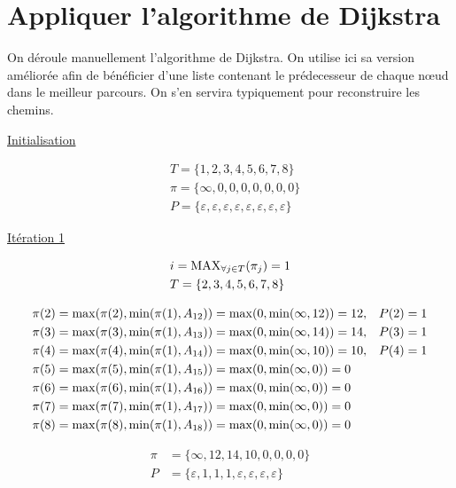 \documentclass{article}
\begin{document}
\section{Appliquer l'algorithme de Dijkstra }

On déroule manuellement l'algorithme de Dijkstra. On utilise ici sa
version améliorée afin de bénéficier d'une liste contenant le
prédecesseur de chaque n\oe ud dans le meilleur parcours. On s'en
servira typiquement pour reconstruire les chemins.

\newpage

\underline{Initialisation}

\begin{align*}
  &T = \{1,2,3,4,5,6,7,8\} \\
  &\pi = \{\infty, 0,0,0,0,0,0,0\} \\
  &P = \{\varepsilon,\varepsilon,\varepsilon,\varepsilon,\varepsilon,\varepsilon,\varepsilon,\varepsilon\}
\end{align*}

\underline{Itération 1}

\begin{align*}
  &i = \operatorname{MAX}_{\forall j \in T}(\pi_j) = 1\\
  &T = \{2,3,4,5,6,7,8\}
\end{align*}

\begin{align*}
  &\pi(2) = \operatorname{max}(\pi(2), \operatorname{min}(\pi(1), A_{12})) = \operatorname{max}(0, \operatorname{min}(\infty,12)) = 12, &P(2) = 1\\
  &\pi(3) = \operatorname{max}(\pi(3), \operatorname{min}(\pi(1), A_{13})) = \operatorname{max}(0, \operatorname{min}(\infty,14)) = 14, &P(3) = 1\\
  &\pi(4) = \operatorname{max}(\pi(4), \operatorname{min}(\pi(1), A_{14})) = \operatorname{max}(0, \operatorname{min}(\infty,10)) = 10, &P(4) = 1\\
  &\pi(5) = \operatorname{max}(\pi(5), \operatorname{min}(\pi(1), A_{15})) = \operatorname{max}(0, \operatorname{min}(\infty,0)) = 0\\
  &\pi(6) = \operatorname{max}(\pi(6), \operatorname{min}(\pi(1), A_{16})) = \operatorname{max}(0, \operatorname{min}(\infty,0)) = 0\\
  &\pi(7) = \operatorname{max}(\pi(7), \operatorname{min}(\pi(1), A_{17})) = \operatorname{max}(0, \operatorname{min}(\infty,0)) = 0\\
  &\pi(8) = \operatorname{max}(\pi(8), \operatorname{min}(\pi(1), A_{18})) = \operatorname{max}(0, \operatorname{min}(\infty,0)) = 0
\end{align*}

\begin{align*}
  \pi &= \{\infty,12,14,10,0,0,0,0\}\\
  P &= \{\varepsilon, 1, 1, 1, \varepsilon, \varepsilon, \varepsilon, \varepsilon\}
\end{align*}
\end{document}

